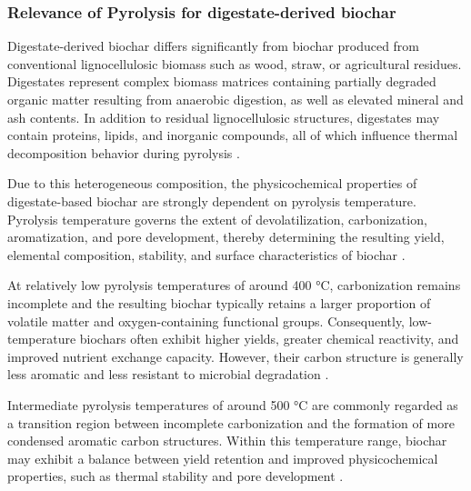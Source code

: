 \subsubsection{Relevance of Pyrolysis for digestate-derived biochar}
\label{subsubsec:digestate-pyrolysis relevance}
Digestate-derived biochar differs significantly from biochar produced from conventional lignocellulosic biomass such as wood, straw, or agricultural residues. Digestates represent complex biomass matrices containing partially degraded organic matter resulting from anaerobic digestion, as well as elevated mineral and ash contents. In addition to residual lignocellulosic structures, digestates may contain proteins, lipids, and inorganic compounds, all of which influence thermal decomposition behavior during pyrolysis \cite{kujawska-2026,sarkar-2024}.

\vspace{0.3em}

Due to this heterogeneous composition, the physicochemical properties of digestate-based biochar are strongly dependent on pyrolysis temperature. Pyrolysis temperature governs the extent of devolatilization, carbonization, aromatization, and pore development, thereby determining the resulting yield, elemental composition, stability, and surface characteristics of biochar \cite{kujawska-2026, manya-2012}.

\vspace{0.3em}

At relatively low pyrolysis temperatures of around 400 °C, carbonization remains incomplete and the resulting biochar typically retains a larger proportion of volatile matter and oxygen-containing functional groups. Consequently, low-temperature biochars often exhibit higher yields, greater chemical reactivity, and improved nutrient exchange capacity. However, their carbon structure is generally less aromatic and less resistant to microbial degradation \cite{wystalska-2021}.

\vspace{0.3em}

Intermediate pyrolysis temperatures of around 500 °C are commonly regarded as a transition region between incomplete carbonization and the formation of more condensed aromatic carbon structures. Within this temperature range, biochar may exhibit a balance between yield retention and improved physicochemical properties, such as thermal stability and pore development \cite{alghashm-2023,kujawska-2026}.

\vspace{0.3em}

